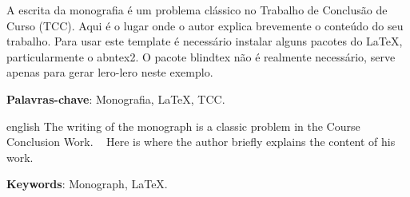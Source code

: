 \documentclass[
	12pt,			%
	openany,		%
	oneside,		%
	a4paper,		%
	english,		%
	brazil			%
	]{abntex2}
\begin{document}
\setlength{\absparsep}{18pt} %

\begin{resumo}
 A escrita da monografia é um problema clássico no Trabalho de Conclusão de Curso (TCC).
 Aqui é o lugar onde o autor explica brevemente o conteúdo do seu trabalho. Para usar este
 template é necessário instalar alguns pacotes do LaTeX, particularmente o abntex2. O pacote
 blindtex não é realmente necessário, serve apenas para gerar lero-lero neste exemplo.
 
 \textbf{Palavras-chave}: Monografia, LaTeX, TCC.
\end{resumo}

\begin{resumo}[Abstract]
 \begin{otherlanguage*}{english}
  The writing of the monograph is a classic problem in the Course Conclusion Work.
  Here is where the author briefly explains the content of his work.
 
 \textbf{Keywords}: Monograph, LaTeX.
 \end{otherlanguage*}
\end{resumo}


\listoffigures*
\cleardoublepage




\tableofcontents*
\cleardoublepage

\textual








\postextual







\printindex
\end{document}
